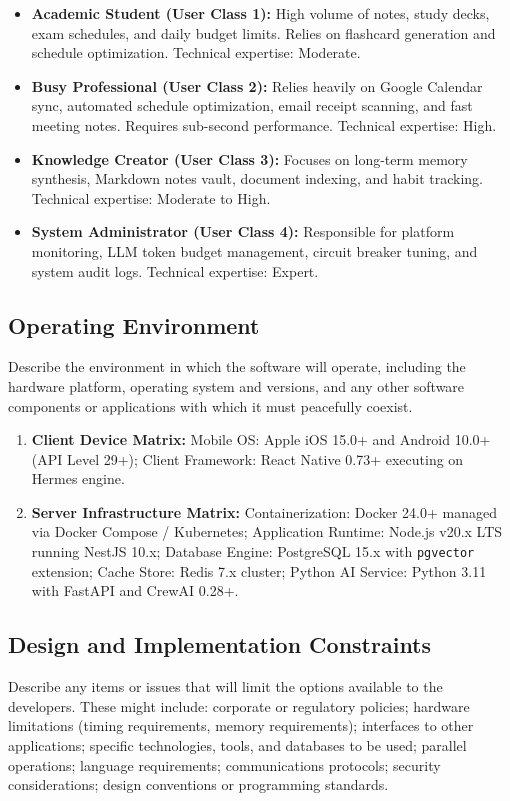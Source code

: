 \documentclass[11pt,a4paper]{article}
\begin{document}
\begin{itemize}
    \item \textbf{Academic Student (User Class 1):} High volume of notes, study decks, exam schedules, and daily budget limits. Relies on flashcard generation and schedule optimization. Technical expertise: Moderate.
    \item \textbf{Busy Professional (User Class 2):} Relies heavily on Google Calendar sync, automated schedule optimization, email receipt scanning, and fast meeting notes. Requires sub-second performance. Technical expertise: High.
    \item \textbf{Knowledge Creator (User Class 3):} Focuses on long-term memory synthesis, Markdown notes vault, document indexing, and habit tracking. Technical expertise: Moderate to High.
    \item \textbf{System Administrator (User Class 4):} Responsible for platform monitoring, LLM token budget management, circuit breaker tuning, and system audit logs. Technical expertise: Expert.
\end{itemize}

\subsection{Operating Environment}
Describe the environment in which the software will operate, including the hardware platform, operating system and versions, and any other software components or applications with which it must peacefully coexist.

\begin{enumerate}
    \item \textbf{Client Device Matrix:} Mobile OS: Apple iOS 15.0+ and Android 10.0+ (API Level 29+); Client Framework: React Native 0.73+ executing on Hermes engine.
    \item \textbf{Server Infrastructure Matrix:} Containerization: Docker 24.0+ managed via Docker Compose / Kubernetes; Application Runtime: Node.js v20.x LTS running NestJS 10.x; Database Engine: PostgreSQL 15.x with \texttt{pgvector} extension; Cache Store: Redis 7.x cluster; Python AI Service: Python 3.11 with FastAPI and CrewAI 0.28+.
\end{enumerate}

\subsection{Design and Implementation Constraints}
Describe any items or issues that will limit the options available to the developers. These might include: corporate or regulatory policies; hardware limitations (timing requirements, memory requirements); interfaces to other applications; specific technologies, tools, and databases to be used; parallel operations; language requirements; communications protocols; security considerations; design conventions or programming standards.
\end{document}
